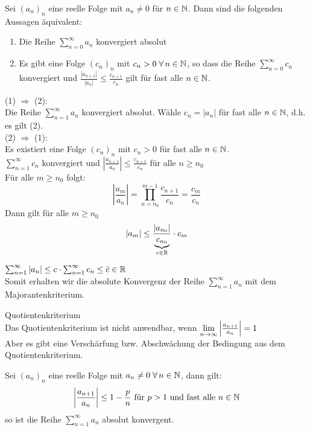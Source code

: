 \documentclass[../ana1u.tex]{subfiles}
\begin{document}
\begin{lem}
    Sei \((a_n)_n\) eine reelle Folge mit \(a_n \neq 0\) für \(n \in \mathbb{N}\). Dann sind die folgenden Aussagen äquivalent:
    \begin{enumerate}
        \item 
            Die Reihe \(\sum_{n=0}^{\infty} a_n\) konvergiert absolut
        \item
            Es gibt eine Folge \((c_n)_n\) mit \(c_n > 0 \; \forall \, n \in \mathbb{N}\), so dass die Reihe \(\sum_{n=0}^{\infty} c_n\) konvergiert und	\(\frac{|a_{n+1}|}{|a_n|} \leq \frac{c_{n+1}}{c_n}\) gilt für fast alle \(n \in \mathbb{N}\).
    \end{enumerate}
\end{lem}
\begin{bew}
    (1) \(\Rightarrow\) (2):\\
    Die Reihe \(\sum_{n=1}^{\infty} a_n\) konvergiert absolut. Wähle \(c_n = |a_n|\) für fast alle \(n \in \mathbb{N}\), d.h. es gilt (2).\\
    (2) \(\Rightarrow\) (1):\\
    Es existiert eine Folge \((c_n)_n\) mit \(c_n > 0\) für fast alle \(n \in \mathbb{N}\).\\
    \(\sum_{n=1}^{\infty} c_n\) konvergiert und \(\left|\frac{a_{n+1}}{a_n}\right| \leq \frac{c_{n+1}}{c_n}\) für alle \(n \geq n_0\)\\
    Für alle \(m \geq n_0\) folgt:
    \[\left|\frac{a_{m}}{a_n}\right| = \prod_{n=n_0}^{m-1} \frac{c_{n+1}}{c_n} = \frac{c_{m}}{c_n}\]
    Dann gilt für alle \(m \geq n_0\)
    \[|a_m| \leq \frac{|a_{n_0}|}{\underbrace{c_{n_0}}_{c \in \mathbb{R}}} \cdot c_m \]
\end{bew}
\begin{bem}
    \(\sum_{n=1}^{\infty} |a_n| \leq c \cdot \sum_{n=1}^{\infty} c_n \leq \tilde{c} \in \mathbb{R}\)\\
    Somit erhalten wir die absolute Konvergenz der Reihe \(\sum_{n=1}^{\infty} a_n\) mit dem Majorantenkriterium.
\end{bem}
\begin{bem}
    Quotientenkriterium\\
    Das Quotientenkriterium ist nicht anwendbar, wenn \(\lim\limits_{n\rightarrow\infty} \left|\frac{a_{n+1}}{a_n}\right| = 1\)\\
    Aber es gibt eine Verschärfung bzw. Abschwächung der Bedingung aus dem Quotientenkriterium.
\end{bem}
\begin{kor}
    Sei \((a_n)_n\) eine reelle Folge mit \(a_n \neq 0 \; \forall \, n \in \mathbb{N}\), dann gilt:
    \[\left|\frac{a_{n+1}}{a_n}\right| \leq 1 - \frac{p}{n} \text{ für } p > 1 \text{ und fast alle } n \in \mathbb{N}\]
    so ist die Reihe \(\sum_{n=1}^{\infty} a_n\) absolut konvergent.
\end{kor}
\end{document}
